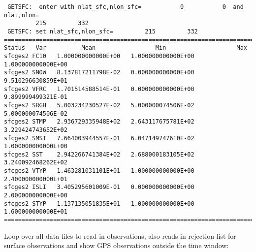 \begin{scriptsize}
\begin{verbatim}
 GETSFC:  enter with nlat_sfc,nlon_sfc=           0           0  and nlat,nlon=
         215         332
 GETSFC: set nlat_sfc,nlon_sfc=         215         332
================================================================================
Status   Var          Mean                 Min                    Max
sfcges2 FC10   1.000000000000E+00   1.000000000000E+00   1.000000000000E+00
sfcges2 SNOW   8.137817211798E-02   0.000000000000E+00   9.510296630859E+01
sfcges2 VFRC   1.701514588514E-01   0.000000000000E+00   9.899999499321E-01
sfcges2 SRGH   5.003234230527E-02   5.000000074506E-02   5.000000074506E-02
sfcges2 STMP   2.936729335948E+02   2.643117675781E+02   3.229424743652E+02
sfcges2 SMST   7.664003944557E-01   6.047149747610E-02   1.000000000000E+00
sfcges2 SST    2.942266741384E+02   2.688000183105E+02   3.240092468262E+02
sfcges2 VTYP   1.463281031101E+01   1.000000000000E+00   2.400000000000E+01
sfcges2 ISLI   3.405295601009E-01   0.000000000000E+00   2.000000000000E+00
sfcges2 STYP   1.137135051835E+01   1.000000000000E+00   1.600000000000E+01
================================================================================
\end{verbatim}
\end{scriptsize}
Loop over all data files to read in observations, also reads in rejection list for surface observations and show GPS observations outside the time window:

